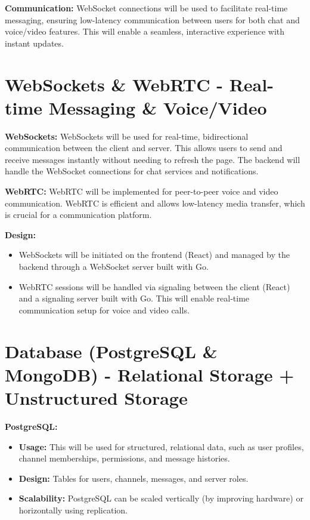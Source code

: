 \documentclass[12pt]{report}
\begin{document}
\textbf{Communication:} WebSocket connections will be used to facilitate real-time messaging, ensuring low-latency communication between users for both chat and voice/video features. This will enable a seamless, interactive experience with instant updates.



\section{WebSockets \& WebRTC - Real-time Messaging \& Voice/Video}

\textbf{WebSockets:} WebSockets will be used for real-time, bidirectional communication between the client and server. This allows users to send and receive messages instantly without needing to refresh the page. The backend will handle the WebSocket connections for chat services and notifications.

\textbf{WebRTC:} WebRTC will be implemented for peer-to-peer voice and video communication. WebRTC is efficient and allows low-latency media transfer, which is crucial for a communication platform.

\textbf{Design:}
\begin{itemize}
    \item WebSockets will be initiated on the frontend (React) and managed by the backend through a WebSocket server built with Go.
    \item WebRTC sessions will be handled via signaling between the client (React) and a signaling server built with Go. This will enable real-time communication setup for voice and video calls.
\end{itemize}


\section{Database (PostgreSQL \& MongoDB) - Relational Storage + Unstructured Storage}

\textbf{PostgreSQL:}
\begin{itemize}
    \item \textbf{Usage:} This will be used for structured, relational data, such as user profiles, channel memberships, permissions, and message histories.
    \item \textbf{Design:} Tables for users, channels, messages, and server roles.
    \item \textbf{Scalability:} PostgreSQL can be scaled vertically (by improving hardware) or horizontally using replication.
\end{itemize}
\end{document}
